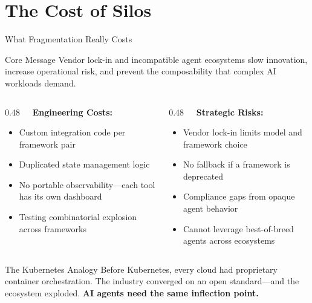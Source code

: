 \section{The Cost of Silos}

\begin{frame}{What Fragmentation Really Costs}
  \vspace{-0.2cm}
  \scriptsize
  \begin{alertblock}{Core Message}
    \scriptsize
    Vendor lock-in and incompatible agent ecosystems slow innovation,
    increase operational risk, and prevent the composability that complex
    AI workloads demand.
  \end{alertblock}

  \vspace{0.1cm}

  \begin{columns}[T]
    \begin{column}{0.48\textwidth}
      \textbf{\ \ Engineering Costs:}
      \begin{itemize}
        \item Custom integration code per framework pair
        \item Duplicated state management logic
        \item No portable observability---each tool has its own dashboard
        \item Testing combinatorial explosion across frameworks
      \end{itemize}
    \end{column}
    \begin{column}{0.48\textwidth}
      \textbf{\ \ Strategic Risks:}
      \begin{itemize}
        \item Vendor lock-in limits model and framework choice
        \item No fallback if a framework is deprecated
        \item Compliance gaps from opaque agent behavior
        \item Cannot leverage best-of-breed agents across ecosystems
      \end{itemize}
    \end{column}
  \end{columns}

  \vspace{-0.2cm}

  \begin{exampleblock}{The Kubernetes Analogy}
    \scriptsize
    Before Kubernetes, every cloud had proprietary container orchestration.
    The industry converged on an open standard---and the ecosystem exploded.
    \textbf{AI agents need the same inflection point.}
  \end{exampleblock}
\end{frame}
